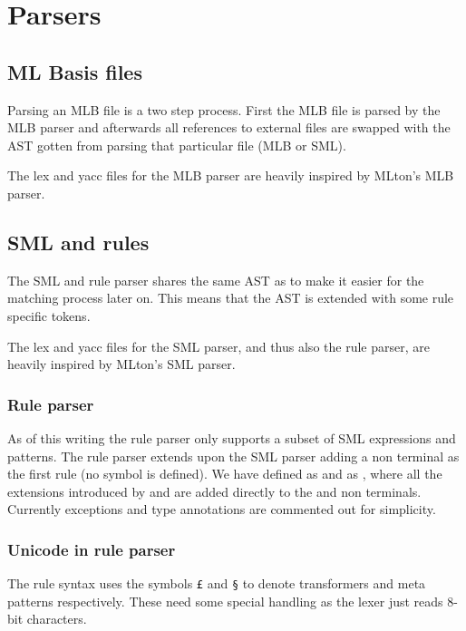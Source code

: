 
\section{Parsers}

\subsection{ML Basis files}

Parsing an MLB file is a two step process. First the MLB file is parsed by the
MLB parser and afterwards all references to external files are swapped with the
AST gotten from parsing that particular file (MLB or SML).

The lex and yacc files for the MLB parser are heavily inspired by MLton's MLB
parser.

\subsection{SML and rules}

The SML and rule parser shares the same AST as to make it easier for the
matching process later on. This means that the AST is extended with some rule
specific tokens.

The lex and yacc files for the SML parser, and thus also the rule parser, are
heavily inspired by MLton's SML parser.

\subsubsection{Rule parser}

As of this writing the rule parser only supports a subset of SML expressions and
patterns. The rule parser extends upon the SML parser adding a 
non terminal as the first rule (no  symbol is defined). We have
defined  as  and  as , where all the
extensions introduced by  and  are added directly to the
 and  non terminals. Currently exceptions and type annotations
are commented out for simplicity.

\subsubsection{Unicode in rule parser}

The rule syntax uses the symbols \texttt{£} and \texttt{§} to denote
transformers and meta patterns respectively. These need some special handling as
the lexer\cite{ml-lex-yacc} just reads 8-bit characters.

